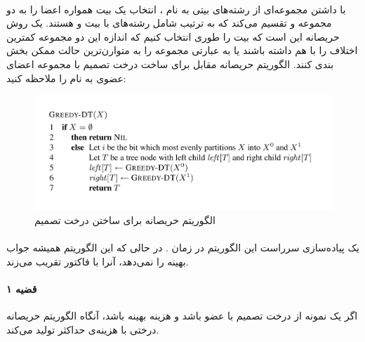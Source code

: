 \documentclass[a4paper]{article}
\begin{document}
	\paragraph{}
	با داشتن مجموعه‌ای از رشته‌های 
	بیتی به نام
	، انتخاب یک بیت
	همواره اعضا را به دو مجموعه 
	و 
	تقسیم می‌کند که به ترتیب شامل رشته‌های با بیت
	و
	هستند. یک روش حریصانه این است که بیت
	را طوری انتخاب کنیم که اندازه این دو مجموعه کمترین اختلاف را با هم داشته باشند یا به عبارتی مجموعه
	را به متوارن‌ترین حالت ممکن بخش بندی کنند. الگوریتم حریصانه مقابل برای ساخت درخت تصمیم با مجموعه اعضای 
	عضوی به نام
	را ملاحظه کنید:
	\begin{figure}[h!]
		\centering
		\includegraphics[width=0.7\linewidth]{Pics/Greedy.png}
		\caption{الگوریتم حریصانه برای ساختن درخت تصمیم}
	\end{figure}
	\paragraph{}
	یک پیاده‌سازی سرراست این الگوریتم در زمان 
	.
	در حالی که این الگوریتم همیشه جواب بهینه را نمی‌دهد، آنرا با فاکتور 
	تقریب می‌زند.
	\paragraph{قضیه ۱}
	اگر
	یک نمونه از درخت تصمیم با
	عضو باشد و هزینه بهینه
	باشد، آنگاه الگوریتم حریصانه درختی با هزینه‌ی حداکثر 
	تولید می‌کند.
\end{document}
